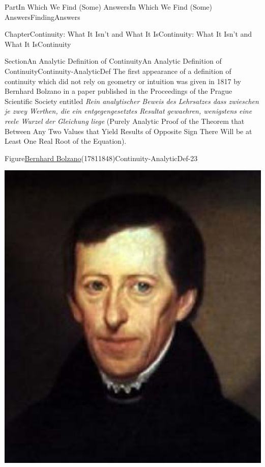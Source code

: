 \documentclass[oneside,10pt,]{book}
\numberwithin{equation}{part}
\begin{document}
\begin{partptx}{Part}{In Which We Find (Some) Answers}{}{In Which We Find (Some) Answers}{}{}{FindingAnswers}
\begin{chapterptx}{Chapter}{Continuity: What It Isn't and What It Is}{}{Continuity: What It Isn't and What It Is}{}{}{Continuity}
\begin{sectionptx}{Section}{An Analytic Definition of Continuity}{}{An Analytic Definition of Continuity}{}{}{Continuity-AnalyticDef}
The first appearance of a definition of continuity which did not rely on geometry or intuition was given in 1817 by Bernhard Bolzano  in a paper published in the Proceedings of the Prague Scientific Society entitled \textit{Rein analytischer Beweis des Lehrsatzes dass zwieschen je zwey Werthen, die ein entgegengesetztes Resultat gewaehren, wenigstens eine reele Wurzel der Gleichung liege} (Purely Analytic Proof of the Theorem that Between Any Two Values that Yield Results of Opposite Sign There Will be at Least One Real Root of the Equation).%
\begin{figureptx}{Figure}{\href{https://mathshistory.st-andrews.ac.uk/Biographies/Bolzano/}{Bernhard Bolzano}\protect\footnotemark{}(1781\textendash{}1848)}{Continuity-AnalyticDef-23}{}%
%
\begin{image}{0.325}{0.35}{0.325}{}%
\includegraphics[width=\linewidth]{external/images/Bolzano.png}
\end{image}%
\tcblower
\end{figureptx}%
%

\end{sectionptx}
\end{chapterptx}
\end{partptx}
\end{document}
